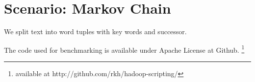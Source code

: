 \section{Scenario: Markov Chain} 

We split text into word tuples with key words and successor.

The code used for benchmarking is available under Apache License at Github. \footnote{available at http://github.com/rkh/hadoop-scripting/}